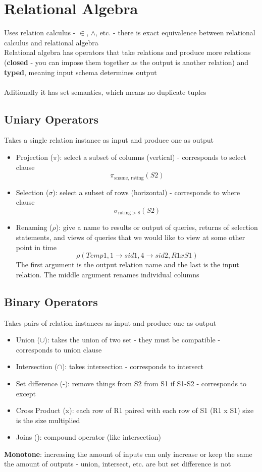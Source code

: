\documentclass{article}
\begin{document}
\section{Relational Algebra}
Uses relation calculus - $\in$, $\land$, etc. - there is exact equivalence between relational calculus and relational algebra \\
Relational algebra has operators that take relations and produce more relations (\textbf{closed} - you can impose them together as the output is another relation) and \textbf{typed}, meaning input schema determines output \\ \\
Aditionally it has set semantics, which means no duplicate tuples
\subsection{Uniary Operators}
Takes a single relation instance as input and produce one as output \begin{itemize}
\item Projection ($\pi$): select a subset of columns (vertical) - corresponds to select clause
\\
$$\pi_{\textrm{sname, rating}}(S2)$$
\item Selection ($\sigma$): select a subset of rows (horizontal) - corresponds to where clause
$$\sigma_{\textrm{rating} > 8}(S2)$$
\item Renaming ($\rho$): give a name to results or output of queries, returns of selection statements, and views of queries that we would like to view at some other point in time
$$\rho(Temp1, 1\rightarrow sid1, 4 \rightarrow sid2, R1 x S1)$$
The first argument is the output relation name and the last is the input relation. The middle argument renames individual columns
\end{itemize}
\subsection{Binary Operators}
Takes pairs of relation instances as input and produce one as output
\begin{itemize}
\item Union ($\cup$): takes the union of two set - they must be compatible - corresponds to union clause
\item Intersection ($\cap$): takes intersection - corresponds to intersect 
\item Set difference (-): remove things from S2 from S1 if S1-S2 - corresponds to except
\item Cross Product (x): each row of R1 paired with each row of S1 (R1 x S1) size is the size multiplied
\item Joins (): compound operator (like intersection) 
\end{itemize}
\textbf{Monotone}: increasing the amount of inputs can only increase or keep the same the amount of outputs - union, intersect, etc. are but set difference is not
\end{document}
